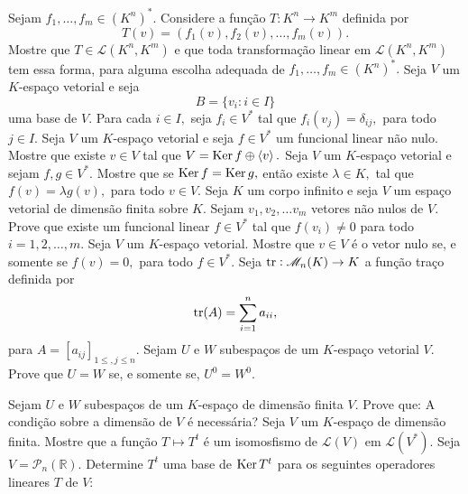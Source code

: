 \documentclass[11pt,a4paper]{article}
\begin{document}
\solucao{}
 Sejam $f_1, \ldots , f_m \in (K^n)^{*}.$ Considere a função $T \colon K^n \to K^m$ definida por
\[T(v) = (f_1(v), f_2(v), \ldots,f_m(v)). \]
Mostre que $T \in \mathcal{L}(K^n, K^m)$ e que toda transformação linear em $\mathcal{L}(K^n, K^m)$ tem essa forma, para alguma escolha adequada de $f_1, \ldots , f_m \in (K^n)^{*}.$
\solucao{}
 Seja $V$ um $K$-espaço vetorial e seja \[B = \{v_i
: i \in I\}\] uma base de $V$. Para cada $i \in I,$ seja $f_i \in V^*$ tal que $f_i(v_j) = \delta_{ij},$ para todo $j \in I.$
\solucao{}
 Seja $V$ um $K$-espaço vetorial e seja $f \in V^{*}$ um funcional linear não nulo. Mostre que existe $v \in V$ tal que $V = \operatorname{Ker} f \oplus \left\langle v \right\rangle.$
\solucao{}
 Seja $V$ um $K$-espaço vetorial e sejam $f,g \in V^{*}.$ Mostre que se $\operatorname{Ker} f = \operatorname{Ker} g,$ então existe $\lambda \in K,$ tal que $f(v) = \lambda g(v),$ para todo $v \in V.$ 
\solucao{}
 Seja $K$ um corpo infinito e seja $V$ um espaço vetorial de dimensão finita sobre $K.$ Sejam $v_1, v_2, \ldots v_m$ vetores não nulos de $V.$ Prove que existe um funcional linear $f \in V^{*}$ tal que $f(v_i)\neq 0$ para todo $i = 1, 2, \ldots ,m.$ 
\solucao{}
 Seja $V$ um $K$-espaço vetorial. Mostre que $v \in V$ é o vetor nulo se, e somente se $f(v) = 0,$ para todo $f \in V^{*}.$
\solucao{}
 Seja $\mathrm{tr }: \mathcal{M}_n(K) \to K$ a função traço definida por
\[
\mathrm{tr }(A) = \displaystyle\sum\limits_{i=1}^n a_{ii},
\]
para $A = [a_{ij}]_{1\le,j\le n}$.
\solucao{}
 Sejam $U$ e $W$ subespaços de um $K$-espaço vetorial $V$. Prove que $U = W$ se, e somente se, $U^{0} = W^{0}.$

\solucao{}
 Sejam $U$ e $W$ subespaços de um $K$-espaço de dimensão finita $V$. Prove que: 
A condição sobre a dimensão de $V$ é necessária?
\solucao{}
 Seja $V$ um $K$-espaço de dimensão finita. Mostre que a função $T \mapsto T^t$ é um isomosfismo de $\mathcal{L}(V)$ em $\mathcal{L}(V^{*}).$
\solucao{}
 Seja $V = \mathcal{P}_n(\mathbb{R}).$ Determine $T^t$ uma base de $\operatorname{Ker} T^t$ para os seguintes operadores lineares $T$ de $V:$
\solucao{}
\newpage
\end{document}
